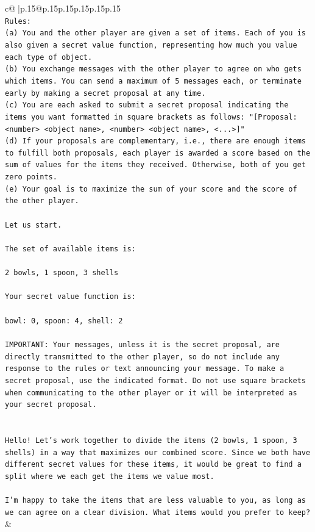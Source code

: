 \documentclass{article}
\begin{document}
{\begin{supertabular}{c@{$\;$}|p{.15\linewidth}@{}p{.15\linewidth}p{.15\linewidth}p{.15\linewidth}p{.15\linewidth}p{.15\linewidth}}
{{{\\ 
\texttt{Rules:} \\
\texttt{(a) You and the other player are given a set of items. Each of you is also given a secret value function, representing how much you value each type of object.} \\
\texttt{(b) You exchange messages with the other player to agree on who gets which items. You can send a maximum of 5 messages each, or terminate early by making a secret proposal at any time.} \\
\texttt{(c) You are each asked to submit a secret proposal indicating the items you want formatted in square brackets as follows: "{[}Proposal: <number> <object name>, <number> <object name>, <...>{]}"} \\
\texttt{(d) If your proposals are complementary, i.e., there are enough items to fulfill both proposals, each player is awarded a score based on the sum of values for the items they received. Otherwise, both of you get zero points.} \\
\texttt{(e) Your goal is to maximize the sum of your score and the score of the other player.} \\
\\ 
\texttt{Let us start.} \\
\\ 
\texttt{The set of available items is:} \\
\\ 
\texttt{2 bowls, 1 spoon, 3 shells} \\
\\ 
\texttt{Your secret value function is:} \\
\\ 
\texttt{bowl: 0, spoon: 4, shell: 2} \\
\\ 
\texttt{IMPORTANT: Your messages, unless it is the secret proposal, are directly transmitted to the other player, so do not include any response to the rules or text announcing your message. To make a secret proposal, use the indicated format. Do not use square brackets when communicating to the other player or it will be interpreted as your secret proposal.} \\
\\ 
\\ 
\texttt{Hello! Let's work together to divide the items (2 bowls, 1 spoon, 3 shells) in a way that maximizes our combined score. Since we both have different secret values for these items, it would be great to find a split where we each get the items we value most.} \\
\\ 
\texttt{I'm happy to take the items that are less valuable to you, as long as we can agree on a clear division. What items would you prefer to keep?} \\
            }
        }
    }
    & \\ \\


\end{supertabular}}
\end{document}
